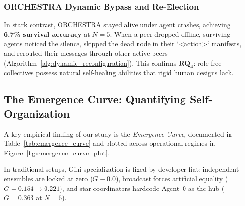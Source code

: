 \documentclass{ieeeaccess}
\begin{document}
\subsubsection{ORCHESTRA Dynamic Bypass and Re-Election}
In stark contrast, ORCHESTRA stayed alive under agent crashes, achieving \textbf{6.7\% survival accuracy} at $N=5$. When a peer dropped offline, surviving agents noticed the silence, skipped the dead node in their `<action>` manifests, and rerouted their messages through other active peers (Algorithm~\ref{alg:dynamic_reconfiguration}). This confirms $\mathbf{RQ_4}$: role-free collectives possess natural self-healing abilities that rigid human designs lack.

\begin{table}[!t]
\centering
\caption{The Emergence Curve: Quantitative Progression of Network Metrics Across Task Complexity Tiers and Fault Perturbations in ORCHESTRA.}
\label{tab:emergence_curve}
\end{table}

\subsection{The Emergence Curve: Quantifying Self-Organization}
A key empirical finding of our study is the \textit{Emergence Curve}, documented in Table~\ref{tab:emergence_curve} and plotted across operational regimes in Figure~\ref{fig:emergence_curve_plot}.

In traditional setups, Gini specialization is fixed by developer fiat: independent ensembles are locked at zero ($G \equiv 0.0$), broadcast forces artificial equality ($G = 0.154 \to 0.221$), and star coordinators hardcode Agent~0 as the hub ($G = 0.363$ at $N=5$).
\end{document}
